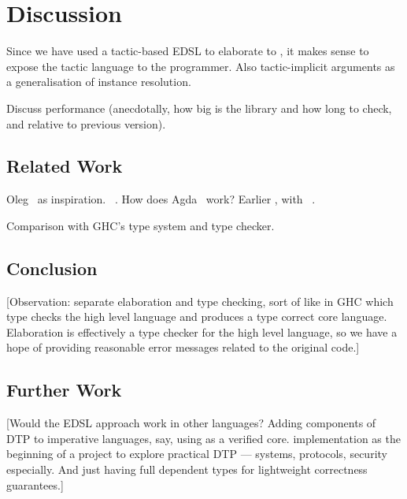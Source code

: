 \section{Discussion}

\label{sect:discussion}

Since we have used a tactic-based EDSL to elaborate \Idris{} to \TT{}, it makes
sense to expose the tactic language to the programmer.
Also tactic-implicit arguments as a generalisation of instance resolution.

Discuss performance (anecdotally, how big is the library and how long to check,
and relative to previous version). 

\subsection{Related Work}

Oleg~\cite{McBride1999} as inspiration. \Epigram{}~\cite{McBride2004a}.
How does Agda~\cite{norell2007thesis} work?
Earlier \Idris{}, with \Ivor{}~\cite{Brady2006b}.

Comparison with GHC's type system and type checker.

\subsection{Conclusion}

[Observation: separate elaboration and type checking, sort of like in GHC which
type checks the high level language and produces a type correct core language.
Elaboration is effectively a type checker for the high level language, so we have
a hope of providing reasonable error messages related to the original code.]


\subsection{Further Work}

[Would the EDSL approach work in other languages? Adding components of DTP
to imperative languages, say, using \TT{} as a verified core.
\Idris{} implementation as the beginning of a project to explore practical
DTP --- systems, protocols, security especially. And just having full
dependent types for lightweight correctness guarantees.]
